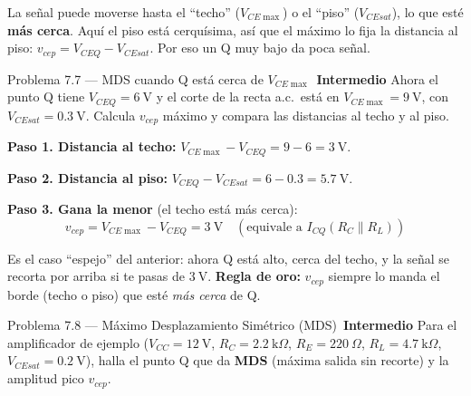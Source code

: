 \documentclass[11pt,a4paper]{article}
\newcommand{\intermedio}{\textcolor{naranjaVivo}{\faIcon{circle}\,\textbf{Intermedio}}}
\begin{document}
\begin{porqueBox}
La señal puede moverse hasta el ``techo'' ($V_{CE\max}$) o el ``piso'' ($V_{CEsat}$), lo que esté \textbf{más cerca}. Aquí el piso está cerquísima, así que el máximo lo fija la distancia al piso: $v_{cep}=V_{CEQ}-V_{CEsat}$. Por eso un Q muy bajo da poca señal.
\end{porqueBox}

\begin{problemaBox}{Problema 7.7 --- MDS cuando Q está cerca de $V_{CE\max}$ \quad \intermedio}
Ahora el punto Q tiene $V_{CEQ}=6\ \text{V}$ y el corte de la recta a.c.\ está en $V_{CE\max}=9\ \text{V}$, con $V_{CEsat}=0.3\ \text{V}$. Calcula $v_{cep}$ máximo y compara las distancias al techo y al piso.
\end{problemaBox}

\begin{solucionBox}
\textbf{Paso 1. Distancia al techo:} $V_{CE\max}-V_{CEQ}=9-6=3\ \text{V}$.

\textbf{Paso 2. Distancia al piso:} $V_{CEQ}-V_{CEsat}=6-0.3=5.7\ \text{V}$.

\textbf{Paso 3. Gana la menor} (el techo está más cerca):
\[
v_{cep}=V_{CE\max}-V_{CEQ}=3\ \text{V}\quad(\text{equivale a } I_{CQ}(R_C\parallel R_L))
\]
\end{solucionBox}

\begin{porqueBox}
Es el caso ``espejo'' del anterior: ahora Q está alto, cerca del techo, y la señal se recorta por arriba si te pasas de $3\ \text{V}$. \textbf{Regla de oro:} $v_{cep}$ siempre lo manda el borde (techo o piso) que esté \emph{más cerca} de Q.
\end{porqueBox}

\begin{problemaBox}{Problema 7.8 --- Máximo Desplazamiento Simétrico (MDS) \quad \intermedio}
Para el amplificador de ejemplo ($V_{CC}=12\ \text{V}$, $R_C=2.2\ \text{k}\Omega$, $R_E=220\ \Omega$, $R_L=4.7\ \text{k}\Omega$, $V_{CEsat}=0.2\ \text{V}$), halla el punto Q que da \textbf{MDS} (máxima salida sin recorte) y la amplitud pico $v_{cep}$.
\end{problemaBox}
\end{document}
